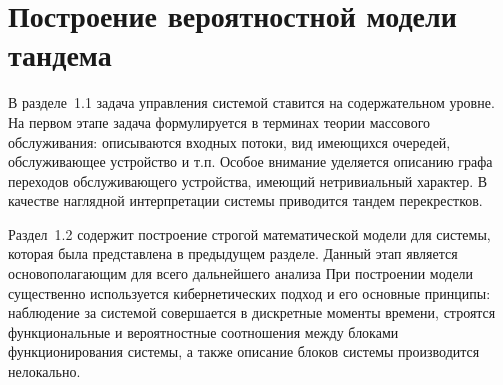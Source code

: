 \documentclass[a4paper,12pt,russian]{extarticle}
\begin{document}
\newpage
\section{Построение вероятностной модели тандема}
В разделе~1.1 задача управления системой ставится на содержательном уровне. На первом этапе задача формулируется в терминах теории массового обслуживания: описываются входных потоки, вид имеющихся очередей, обслуживающее устройство и т.п. Особое внимание уделяется описанию графа переходов обслуживающего устройства, имеющий нетривиальный характер. В качестве наглядной интерпретации системы приводится тандем перекрестков. 

Раздел~1.2 содержит построение строгой математической модели для системы, которая была представлена в предыдущем разделе. Данный этап является основополагающим для всего дальнейшего анализа  При построении модели существенно используется кибернетических подход и его основные принципы: наблюдение за системой совершается в дискретные моменты времени,  строятся функциональные и вероятностные соотношения между блоками функционирования системы, а также описание блоков системы производится нелокально.
\end{document}
